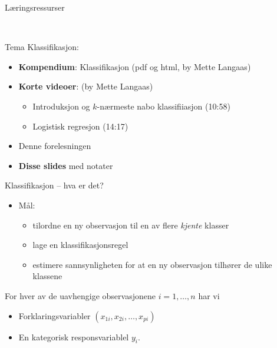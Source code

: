 \documentclass[10pt,ignorenonframetext,]{beamer}
\providecommand{\tightlist}{%
  \setlength{\itemsep}{0pt}\setlength{\parskip}{0pt}}
\begin{document}
\begin{frame}{Læringsressurser}
\protect\hypertarget{luxe6ringsressurser}{}

\vspace{2mm}

\(~\)

Tema Klassifikasjon:

\vspace{2mm}

\begin{itemize}
\item
  \textbf{Kompendium}: Klassifikasjon (pdf og html, by Mette Langaas)
\item
  \textbf{Korte videoer}: (by Mette Langaas)

  \begin{itemize}
  \tightlist
  \item
    Introduksjon og \(k\)-nærmeste nabo klassifiiasjon (10:58)
  \item
    Logistisk regresjon (14:17)
  \end{itemize}
\item
  Denne forelesningen
\item
  \textbf{Disse slides} med notater
\end{itemize}

\end{frame}

\begin{frame}{Klassifikasjon -- hva er det?}
\protect\hypertarget{klassifikasjon-hva-er-det}{}

\begin{itemize}
\item
  Mål:

  \begin{itemize}
  \item
    tilordne en ny observasjon til en av flere \emph{kjente} klasser
  \item
    lage en klassifikasjonsregel
  \item
    estimere sannsynligheten for at en ny observasjon tilhører de ulike
    klassene
  \end{itemize}
\end{itemize}

\vspace{2mm}

For hver av de uavhengige observasjonene \(i=1,\ldots,n\) har vi

\begin{itemize}
\tightlist
\item
  Forklaringsvariabler \((x_{1i},x_{2i},\ldots,x_{pi})\)
\item
  En kategorisk responsvariablel \(y_i\).
\end{itemize}

\end{frame}
\end{document}
